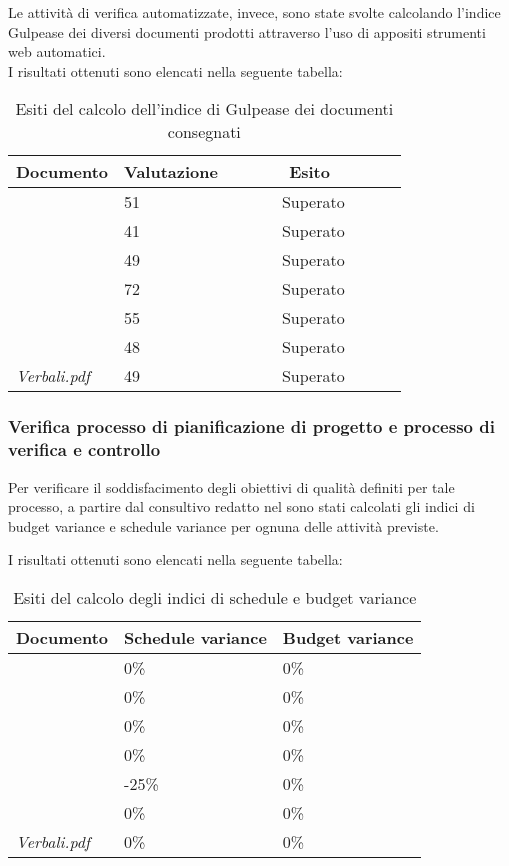 		Le attività di verifica automatizzate, invece, sono state svolte calcolando l'indice Gulpease dei 	
		diversi documenti prodotti attraverso l'uso di appositi strumenti web automatici. 
		\\I risultati ottenuti sono elencati nella seguente tabella:
		\begin{table}[H]
		\begin{tabular}{|l|l|l|}
		\hline
		\textbf{Documento} 		&\textbf{Valutazione} &\textbf{~~~~~~Esito~~~~~~} \\
		\hline
		\PdQ 					&51		&~~~~~~Superato~~~~~~\\
		\NdP 					&41		&~~~~~~Superato~~~~~~\\
		\SdF 					&49		&~~~~~~Superato~~~~~~\\	
		\AdR 					&72		&~~~~~~Superato~~~~~~\\
		\PdP 					&55		&~~~~~~Superato~~~~~~\\
		\Glossario 				&48		&~~~~~~Superato~~~~~~\\
		\textit{Verbali.pdf} 		&49		&~~~~~~Superato~~~~~~\\
		\hline
		\end{tabular}
		\caption{Esiti del calcolo dell'indice di Gulpease dei documenti consegnati}
		\end{table}
		
		\subsubsection{Verifica processo di pianificazione di progetto e processo di verifica e controllo}
		Per verificare il soddisfacimento degli obiettivi di qualità definiti per tale processo, a partire dal 				consultivo redatto nel \PdP sono stati calcolati gli indici di budget variance e schedule variance per ognuna delle attività previste.
		
		I risultati ottenuti sono elencati nella seguente tabella:	
		\begin{table}[H]
		\begin{tabular}{|l|l|l|}
		\hline
		\textbf{Documento} 		&\textbf{Schedule variance} &\textbf{Budget variance} \\
		\hline
		\PdQ 					&0\%		&0\%\\
		\NdP 					&0\%		&0\%\\
		\SdF 					&0\%		&0\%\\
		\AdR 					&0\%		&0\%\\
		\PdP 					&-25\%		&0\%\\
		\Glossario 				&0\%		&0\%\\
		\textit{Verbali.pdf} 			&0\%		&0\%\\
		\hline
		\end{tabular}
		\caption{Esiti del calcolo degli indici di schedule e budget variance}
		\end{table}


